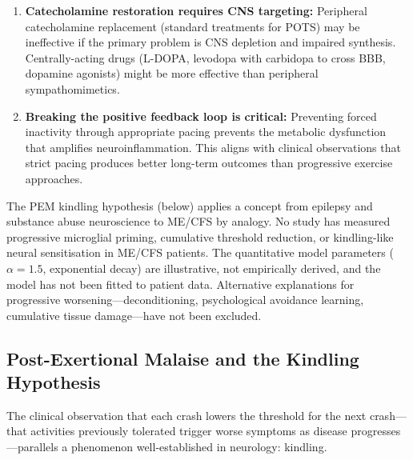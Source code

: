 \begin{hypothesis}
\begin{enumerate}
    \item \textbf{Catecholamine restoration requires CNS targeting:} Peripheral catecholamine replacement (standard treatments for POTS) may be ineffective if the primary problem is CNS depletion and impaired synthesis. Centrally-acting drugs (L-DOPA, levodopa with carbidopa to cross BBB, dopamine agonists) might be more effective than peripheral sympathomimetics.

    \item \textbf{Breaking the positive feedback loop is critical:} Preventing forced inactivity through appropriate pacing prevents the metabolic dysfunction that amplifies neuroinflammation. This aligns with clinical observations that strict pacing produces better long-term outcomes than progressive exercise approaches.
\end{enumerate}

\end{hypothesis}

\begin{limitation}
The PEM kindling hypothesis (below) applies a concept from epilepsy and substance abuse neuroscience to ME/CFS by analogy. No study has measured progressive microglial priming, cumulative threshold reduction, or kindling-like neural sensitisation in ME/CFS patients. The quantitative model parameters ($\alpha = 1.5$, exponential decay) are illustrative, not empirically derived, and the model has not been fitted to patient data. Alternative explanations for progressive worsening---deconditioning, psychological avoidance learning, cumulative tissue damage---have not been excluded.
\end{limitation}

\subsection{Post-Exertional Malaise and the Kindling Hypothesis}

The clinical observation that each crash lowers the threshold for the next crash---that activities previously tolerated trigger worse symptoms as disease progresses---parallels a phenomenon well-established in neurology: kindling.

